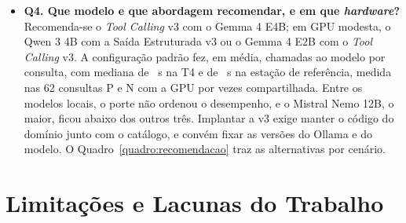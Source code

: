 \begin{itemize}
  \item \textbf{Q4. Que modelo e que abordagem recomendar, e em que \textit{hardware}?} Recomenda-se o \textit{Tool Calling} v3 com o Gemma 4 E4B; em GPU modesta, o Qwen 3 4B com a Saída Estruturada v3 ou o Gemma 4 E2B com o \textit{Tool Calling} v3. A configuração padrão fez, em média,  chamadas ao modelo por consulta, com mediana de ~s na T4 e de ~s na estação de referência, medida nas 62 consultas P e N com a GPU por vezes compartilhada. Entre os modelos locais, o porte não ordenou o desempenho, e o Mistral Nemo 12B, o maior, ficou abaixo dos outros três. Implantar a v3 exige manter o código do domínio junto com o catálogo, e convém fixar as versões do Ollama e do modelo. O Quadro~\ref{quadro:recomendacao} traz as alternativas por cenário.
\end{itemize}

\section{Limitações e Lacunas do Trabalho}
\label{sec:limitacoes-trabalho}

